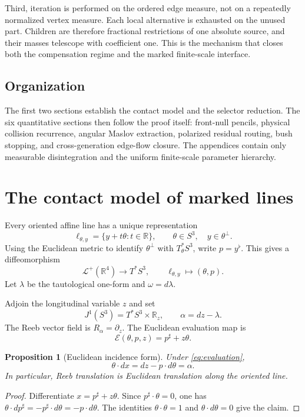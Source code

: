 \documentclass[10pt]{article}
\newtheorem{proposition}[theorem]{Proposition}
\newcommand{\R}{\mathbb R}
\begin{document}
Third, iteration is performed on the ordered edge measure, not on a repeatedly normalized vertex
measure.  Each local alternative is exhausted on the unused part.  Children are therefore
fractional restrictions of one absolute source, and their masses telescope with coefficient one.
This is the mechanism that closes both the compensation regime and the marked finite-scale
interface.

\subsection{Organization}

The first two sections establish the contact model and the selector reduction.  The six
quantitative sections then follow the proof itself: front-null pencils, physical collision
recurrence, angular Maslov extraction, polarized residual routing, bush stopping, and
cross-generation edge-flow closure.  The appendices contain only measurable disintegration
and the uniform finite-scale parameter hierarchy.

\section{The contact model of marked lines}
\label{sec:contact-model}

Every oriented affine line has a unique representation
\[
 \ell_{\theta,y}=\{y+t\theta:t\in\R\},
 \qquad
 \theta\in S^3,\quad y\in\theta^\perp.
\]
Using the Euclidean metric to identify $\theta^\perp$ with $T^*_\theta S^3$, write
$p=y^\flat$. This gives a diffeomorphism
\[
 \mathcal L^+(\R^4)\longrightarrow T^*S^3,
 \qquad
 \ell_{\theta,y}\longmapsto(\theta,p).
\]
Let $\lambda$ be the tautological one-form and $\omega=d\lambda$.

Adjoin the longitudinal variable $z$ and set
\[
 J^1(S^3)=T^*S^3\times\R_z,
 \qquad
 \alpha=dz-\lambda.
\]
The Reeb vector field is $R_\alpha=\partial_z$. The Euclidean evaluation map is
\begin{equation}
\label{eq:evaluation}
 \mathcal E(\theta,p,z)=p^\sharp+z\theta.
\end{equation}

\begin{proposition}[Euclidean incidence form]
Under \cref{eq:evaluation},
\[
 \theta\cdot dx=dz-p\cdot d\theta=\alpha.
\]
In particular, Reeb translation is Euclidean translation along the oriented line.
\end{proposition}

\begin{proof}
Differentiate $x=p^\sharp+z\theta$. Since $p^\sharp\cdot\theta=0$, one has
$\theta\cdot dp^\sharp=-p^\sharp\cdot d\theta=-p\cdot d\theta$. The identities
$\theta\cdot\theta=1$ and $\theta\cdot d\theta=0$ give the claim.
\end{proof}
\end{document}
